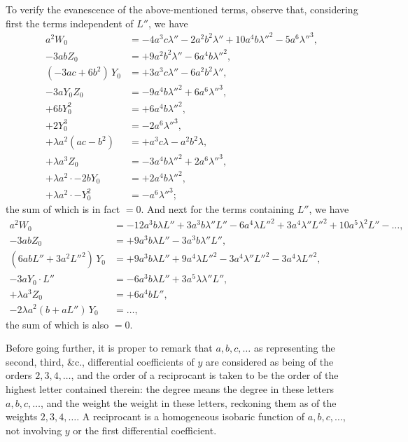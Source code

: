 \documentclass[11pt]{article}
\begin{document}
To verify the evanescence of the above-mentioned terms, observe that, considering first the terms independent of $L''$, we have
\begin{align*}
a^2W_0 &= -4a^3c\lambda'' - 2a^2b^2\lambda'' + 10a^4b\lambda''^2 - 5a^6\lambda''^3,\\
-3abZ_0 &= +9a^2b^2\lambda'' - 6a^4b\lambda''^2,\\
(-3ac + 6b^2)\,Y_0 &= +3a^3c\lambda'' - 6a^2b^2\lambda'',\\
-3aY_0Z_0 &= -9a^4b\lambda''^2 + 6a^6\lambda''^3,\\
+6bY_0^2 &= +6a^4b\lambda''^2,\\
+2Y_0^3 &= -2a^6\lambda''^3,\\
+\lambda a^2(ac - b^2) &= +a^3c\lambda - a^2b^2\lambda,\\
+\lambda a^3Z_0 &= -3a^4b\lambda''^2 + 2a^6\lambda''^3,\\
+\lambda a^2\cdot -2bY_0 &= +2a^4b\lambda''^2,\\
+\lambda a^2\cdot -Y_0^2 &= -a^6\lambda''^3;
\end{align*}
the sum of which is in fact $=0$. And next for the terms containing $L''$, we have
\begin{align*}
a^2W_0 &= -12a^3b\lambda L'' + 3a^3b\lambda''L'' - 6a^4\lambda L''^2 + 3a^4\lambda''L''^2 + 10a^5\lambda^2L'' - \ldots,\\
-3abZ_0 &= +9a^3b\lambda L'' - 3a^3b\lambda''L'',\\
(6abL'' + 3a^2L''^2)\,Y_0 &= +9a^3b\lambda L'' + 9a^4\lambda L''^2 - 3a^4\lambda''L''^2 - 3a^4\lambda L''^2,\\
-3aY_0\cdot L'' &= -6a^3b\lambda L'' + 3a^5\lambda\lambda''L'',\\
+\lambda a^3Z_0 &= +6a^4bL'',\\
-2\lambda a^2(b + aL'')\,Y_0 &= \ldots,
\end{align*}
the sum of which is also $=0$.

Before going further, it is proper to remark that $a, b, c, \ldots$ as representing the second, third, \&c., differential coefficients of $y$ are considered as being of the orders $2, 3, 4, \ldots$, and the order of a reciprocant is taken to be the order of the highest letter contained therein: the degree means the degree in these letters $a, b, c, \ldots$, and the weight the weight in these letters, reckoning them as of the weights $2, 3, 4, \ldots$. A reciprocant is a homogeneous isobaric function of $a, b, c, \ldots$, not involving $y$ or the first differential coefficient.
\end{document}
